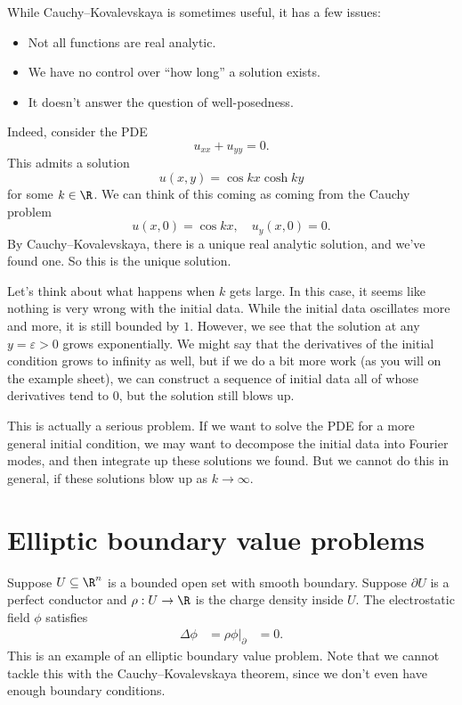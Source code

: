 \documentclass[a4paper]{article}
\begin{document}
While Cauchy--Kovalevskaya is sometimes useful, it has a few issues:
\begin{itemize}
  \item Not all functions are real analytic.
  \item We have no control over ``how long'' a solution exists.
  \item It doesn't answer the question of well-posedness.
\end{itemize}

Indeed, consider the PDE
\[
  u_{xx} + u_{yy} = 0.
\]
This admits a solution
\[
  u(x, y) = \cos kx \cosh ky
\]
for some $k \in \R$. We can think of this coming as coming from the Cauchy problem
\[
  u(x, 0) = \cos kx,\quad u_y(x, 0) = 0.
\]
By Cauchy--Kovalevskaya, there is a unique real analytic solution, and we've found one. So this is the unique solution.

Let's think about what happens when $k$ gets large. In this case, it seems like nothing is very wrong with the initial data. While the initial data oscillates more and more, it is still bounded by $1$. However, we see that the solution at any $y = \varepsilon > 0$ grows exponentially. We might say that the derivatives of the initial condition grows to infinity as well, but if we do a bit more work (as you will on the example sheet), we can construct a sequence of initial data all of whose derivatives tend to $0$, but the solution still blows up.

This is actually a serious problem. If we want to solve the PDE for a more general initial condition, we may want to decompose the initial data into Fourier modes, and then integrate up these solutions we found. But we cannot do this in general, if these solutions blow up as $k \to \infty$.

\section{Elliptic boundary value problems}
Suppose $U \subseteq \R^n$ is a bounded open set with smooth boundary. Suppose $\partial U$ is a perfect conductor and $\rho: U \to \R$ is the charge density inside $U$. The electrostatic field $\phi$ satisfies
\begin{align*}
  \Delta \phi &= \rho
  \phi |_{\partial } &= 0.
\end{align*}
This is an example of an elliptic boundary value problem. Note that we cannot tackle this with the Cauchy--Kovalevskaya theorem, since we don't even have enough boundary conditions.
\end{document}
